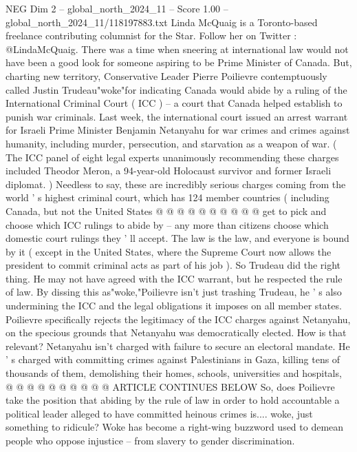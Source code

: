 \begin{textsample}{NEG Dim 2 – global\_north\_2024\_11 – Score 1.00 – global\_north\_2024\_11/118197883.txt}  \label{ex:f2_neg_193}
Linda McQuaig is a Toronto-based freelance contributing columnist for the Star.
Follow her on Twitter : @LindaMcQuaig.
There was a time when sneering at international law would not have been a good look for someone aspiring to be Prime Minister of Canada.
But, charting new territory, Conservative Leader Pierre Poilievre contemptuously called Justin Trudeau"woke"for indicating Canada would abide by a ruling of the International Criminal Court ( ICC ) -- a court that Canada helped establish to punish war criminals.
Last week, the international court issued an arrest warrant for Israeli Prime Minister Benjamin Netanyahu for war crimes and crimes against humanity, including murder, persecution, and starvation as a weapon of war. ( The ICC panel of eight legal experts unanimously recommending these charges included Theodor Meron, a 94-year-old Holocaust survivor and former Israeli diplomat. ) Needless to say, these are incredibly serious charges coming from the world ' s highest criminal court, which has 124 member countries ( including Canada, but not the United States @ @ @ @ @ @ @ @ @ @ get to pick and choose which ICC rulings to abide by -- any more than citizens choose which domestic court rulings they ' ll accept.
The law is the law, and everyone is bound by it ( except in the United States, where the Supreme Court now allows the president to commit criminal acts as part of his job ).
So Trudeau did the right thing.
He may not have agreed with the ICC warrant, but he respected the rule of law.
By dissing this as"woke,"Poilievre isn't just trashing Trudeau, he ' s also undermining the ICC and the legal obligations it imposes on all member states.
Poilievre specifically rejects the legitimacy of the ICC charges against Netanyahu, on the specious grounds that Netanyahu was democratically elected.
How is that relevant?
Netanyahu isn't charged with failure to secure an electoral mandate.
He ' s charged with committing crimes against Palestinians in Gaza, killing tens of thousands of them, demolishing their homes, schools, universities and hospitals, @ @ @ @ @ @ @ @ @ @ ARTICLE CONTINUES BELOW So, does Poilievre take the position that abiding by the rule of law in order to hold accountable a political leader alleged to have committed heinous crimes is.... woke, just something to ridicule?
Woke has become a right-wing buzzword used to demean people who oppose injustice -- from slavery to gender discrimination.

\end{textsample}
